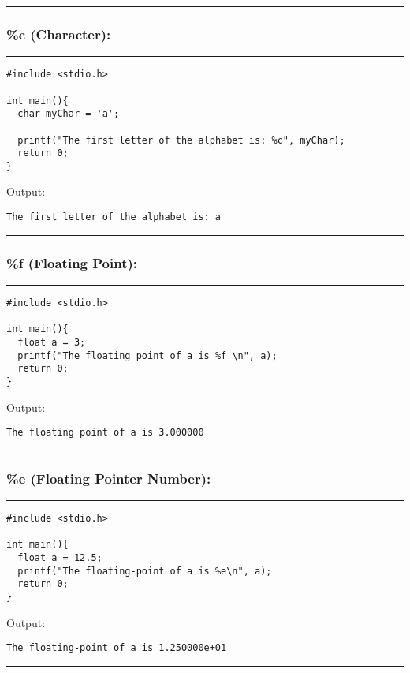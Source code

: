\documentclass[a4paper]{article}
\begin{document}
\noindent\rule{\textwidth}{0.5pt}

\subsubsection{\%c (Character):}
\label{sec:orga35ac53}

\noindent\rule{\textwidth}{0.5pt}
\begin{verbatim}
#include <stdio.h>

int main(){
  char myChar = 'a';

  printf("The first letter of the alphabet is: %c", myChar);
  return 0;
}
\end{verbatim}
Output:
\begin{verbatim}
The first letter of the alphabet is: a
\end{verbatim}

\noindent\rule{\textwidth}{0.5pt}

\subsubsection{\%f (Floating Point):}
\label{sec:org11a23aa}

\noindent\rule{\textwidth}{0.5pt}
\begin{verbatim}
#include <stdio.h>

int main(){
  float a = 3;
  printf("The floating point of a is %f \n", a);
  return 0;
}
\end{verbatim}
Output:
\begin{verbatim}
The floating point of a is 3.000000 
\end{verbatim}

\noindent\rule{\textwidth}{0.5pt}

\subsubsection{\%e (Floating Pointer Number):}
\label{sec:orgd5a3614}

\noindent\rule{\textwidth}{0.5pt}
\begin{verbatim}
#include <stdio.h>

int main(){
  float a = 12.5;
  printf("The floating-point of a is %e\n", a);
  return 0;
}
\end{verbatim}
Output:
\begin{verbatim}
The floating-point of a is 1.250000e+01
\end{verbatim}

\noindent\rule{\textwidth}{0.5pt}
\end{document}
